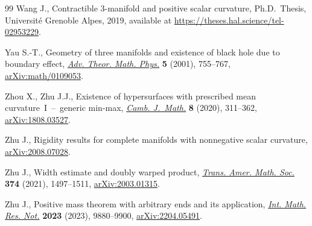 \documentclass[10pt,a4paper]{amsart}
\numberwithin{equation}{section}
\begin{document}
\begin{thebibliography}{99}
Wang J., Contractible 3-manifold and positive scalar curvature, Ph.D.~Thesis,
  {U}niversit{\'e} {G}renoble {A}lpes, 2019, available at
  \url{https://theses.hal.science/tel-02953229}.

Yau S.-T., Geometry of three manifolds and existence of black hole due to
  boundary effect, \href{https://doi.org/10.4310/ATMP.2001.v5.n4.a4}{\textit{Adv. Theor. Math. Phys.}} \textbf{5} (2001),
  755--767, \href{https://arxiv.org/abs/math/0109053}{arXiv:math/0109053}.

Zhou X., Zhu J.J., Existence of hypersurfaces with prescribed mean
  curvature~{I}~--~generic min-max, \href{https://doi.org/10.4310/CJM.2020.v8.n2.a2}{\textit{Camb. J.~Math.}} \textbf{8} (2020),
  311--362, \href{https://arxiv.org/abs/1808.03527}{arXiv:1808.03527}.

Zhu J., Rigidity results for complete manifolds with nonnegative scalar
  curvature, \href{https://arxiv.org/abs/2008.07028}{arXiv:2008.07028}.

Zhu J., Width estimate and doubly warped product, \href{https://doi.org/10.1090/tran/8263}{\textit{Trans. Amer. Math.
  Soc.}} \textbf{374} (2021), 1497--1511, \href{https://arxiv.org/abs/2003.01315}{arXiv:2003.01315}.

Zhu J., Positive mass theorem with arbitrary ends and its application,
  \href{https://doi.org/10.1093/imrn/rnac117}{\textit{Int. Math. Res. Not.}} \textbf{2023} (2023), 9880--9900,
  \href{https://arxiv.org/abs/2204.05491}{arXiv:2204.05491}.

\end{thebibliography}
\end{document}
